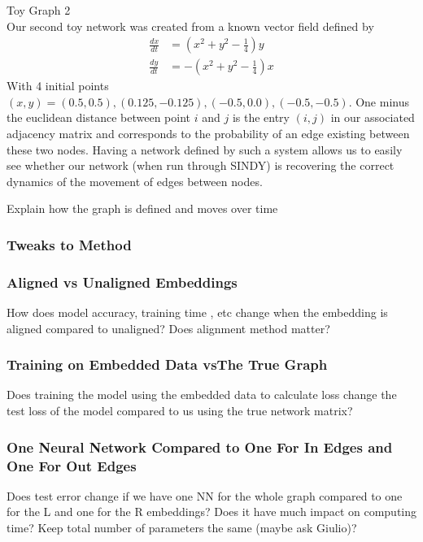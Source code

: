 \documentclass{article}
\begin{document}
            
            Toy Graph 2\\
                Our second toy network was created from a known vector field defined by
                \begin{align}
                    \frac{dx}{dt} &= (x^2+y^2-\frac14)y\\
                    \frac{dy}{dt} &= -(x^2+y^2-\frac14)x
                \end{align}
                With 4 initial points $(x,y)=(0.5,0.5), (0.125, -0.125), (-0.5, 0.0), (-0.5, -0.5)$. One minus the euclidean distance between point $i$ and $j$ is the entry $(i,j)$ in our associated adjacency matrix and corresponds to the probability of an edge existing between these two nodes. Having a network defined by such a system allows us to easily see whether our network (when run through SINDY) is recovering the correct dynamics of the movement of edges between nodes.

            
            
            
            
            
            Explain how the graph is defined and moves over time
        \subsubsection{Tweaks to Method}
            \subsubsection{Aligned vs Unaligned Embeddings}
                How does model accuracy, training time , etc change when the embedding is aligned compared to unaligned? Does alignment method matter?
            \subsubsection{Training on Embedded Data vsThe True Graph}
                Does training the model using the embedded data to calculate loss change the test loss of the model compared to us using the true network matrix?
            \subsubsection{One Neural Network Compared to One For In Edges and One For Out Edges}
                Does test error change if we have one NN for the whole graph compared to one for the L and one for the R embeddings? Does it have much impact on computing time? Keep total number of parameters the same (maybe ask Giulio)?
\end{document}
